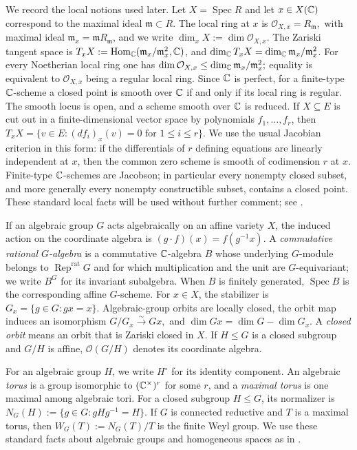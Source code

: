 \documentclass[10pt,a4paper]{amsart}
\numberwithin{equation}{section} \newtheorem{thm}{Theorem}[section] \newtheorem{lem}[thm]{Lemma} \newtheorem{ex}[thm]{Example} \newtheorem{prop}[thm]{Proposition} \newtheorem{cor}[thm]{Corollary} \newtheorem{defi}[thm]{Definition} \newtheorem{rmk}[thm]{Remark} \newtheorem{notation}[thm]{Notation}
\newcommand{\Rep}{\operatorname{Rep}}
\newcommand{\Spec}{\operatorname{Spec}}
\newcommand{\Hom}{\operatorname{Hom}}
\newcommand{\OO}{\mathcal O}
\begin{document}
We record the local notions used later. Let $X=\Spec R$ and let $x\in X(\mathbb{C})$ correspond to the maximal ideal $\mathfrak m\subset R$. The local ring at $x$ is \(\mathcal O_{X,x}=R_{\mathfrak m},\) with maximal ideal $\mathfrak m_x=\mathfrak mR_{\mathfrak m}$, and we write \(\dim_xX:=\dim\mathcal O_{X,x}.\) The Zariski tangent space is \(T_xX:=\Hom_\C(\mathfrak m_x/\mathfrak m_x^2,\C)\), and \(\dim_{\mathbb{C}} T_xX=\dim_{\mathbb{C}}\mathfrak m_x/\mathfrak m_x^2\). For every Noetherian local ring one has \(\dim\mathcal O_{X,x}\leq\dim_{\mathbb{C}}\mathfrak m_x/\mathfrak m_x^2;\) equality is equivalent to $\mathcal O_{X,x}$ being a regular local ring. Since $\mathbb{C}$ is perfect, for a finite-type $\mathbb{C}$-scheme a closed point is smooth over $\mathbb{C}$ if and only if its local ring is regular. The smooth locus is open, and a scheme smooth over $\mathbb{C}$ is reduced. If $X\subseteq E$ is cut out in a finite-dimensional vector space by polynomials $f_1,\ldots,f_r$, then \(T_xX=\{v\in E:(df_i)_x(v)=0\text{ for }1\leq i\leq r\}.\) We use the usual Jacobian criterion in this form: if the differentials of $r$ defining equations are linearly independent at $x$, then the common zero scheme is smooth of codimension $r$ at $x$. Finite-type $\mathbb{C}$-schemes are Jacobson; in particular every nonempty closed subset, and more generally every nonempty constructible subset, contains a closed point. These standard local facts will be used without further comment; see \cite[Chapter~I, \S5 and Chapter~III, \S10]{Hartshorne}.

If an algebraic group $G$ acts algebraically on an affine variety $X$, the induced action on the coordinate algebra is \((g\cdot f)(x)=f(g^{-1}x)\). A \emph{commutative rational $G$-algebra} is a commutative $\mathbb{C}$-algebra $B$ whose underlying $G$-module belongs to $\Rep^{\mathrm{rat}}G$ and for which multiplication and the unit are $G$-equivariant; we write $B^G$ for its invariant subalgebra. When $B$ is finitely generated, $\Spec B$ is the corresponding affine $G$-scheme. For $x\in X$, the stabilizer is \(G_x=\{g\in G:gx=x\}\). Algebraic-group orbits are locally closed, the orbit map induces an isomorphism \(G/G_x\overset{\sim}{\longrightarrow}Gx,\) and \(\dim Gx=\dim G-\dim G_x.\) A \emph{closed orbit} means an orbit that is Zariski closed in $X$. If $H\leq G$ is a closed subgroup and $G/H$ is affine, $\OO(G/H)$ denotes its coordinate algebra.

For an algebraic group $H$, we write $H^\circ$ for its identity component. An algebraic \emph{torus} is a group isomorphic to $(\mathbb{C}^\times)^r$ for some $r$, and a \emph{maximal torus} is one maximal among algebraic tori. For a closed subgroup $H\leq G$, its normalizer is \(N_G(H):=\{g\in G:gHg^{-1}=H\}.\) If $G$ is connected reductive and $T$ is a maximal torus, then \(W_G(T):=N_G(T)/T\) is the finite Weyl group. We use these standard facts about algebraic groups and homogeneous spaces as in \cite[Chapters~1--2]{SpringerLAG}.
\end{document}
